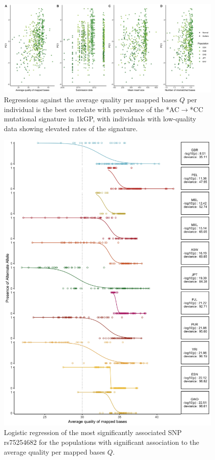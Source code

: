 \documentclass[9pt,lineno]{elife}
\begin{document}
\begin{figure}
\includegraphics[width=\hsize,keepaspectratio]{./Figures/PC1_Correlation.jpg}
\caption{Regressions against the average quality per mapped bases $Q$ per individual is the best correlate with prevalence of the  *AC${\rightarrow}$*CC mutational signature in 1kGP, with individuals with low-quality data showing elevated rates of the signature.  }
\label{PC1_Correlation}
\end{figure}

\begin{figure}
\includegraphics[width=\hsize,keepaspectratio]{./Figures/RegressionPlot_mostSig2.jpg}
\caption{Logistic regression of the most significantly associated SNP rs75254682 for the populations with significant association to the average quality per mapped bases $Q$.}
\label{MostSig}
\end{figure}
\end{document}
